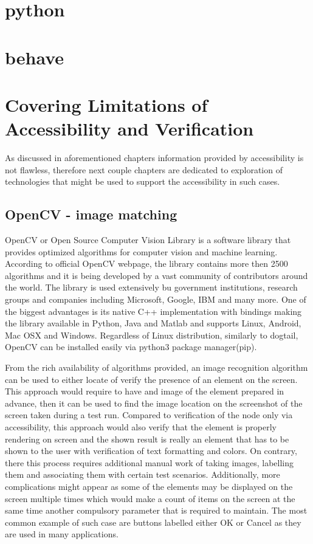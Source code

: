 \chapter{python}
\chapter{behave}
\chapter{Covering Limitations of Accessibility and Verification}
As discussed in aforementioned chapters information provided by accessibility is not flawless, therefore next couple chapters are dedicated to exploration of technologies that might be used to support the accessibility in such cases.

\section{OpenCV - image matching}
OpenCV or Open Source Computer Vision Library is a software library that provides optimized algorithms for computer vision and machine learning. According to official OpenCV webpage\cite{opencv}, the library contains more then 2500 algorithms and it is being developed 
by a vast community of contributors around the world. The library is used extensively bu government institutions, research groups and companies including Microsoft, Google, IBM and many more. One of the biggest advantages is its native C++ implementation with bindings making the library available in Python, Java and Matlab and supports Linux, Android, Mac OSX and Windows. Regardless of Linux distribution, similarly to dogtail, OpenCV can be installed easily via python3 package manager(pip). 

From the rich availability of algorithms provided, an image recognition algorithm can be used to either locate of verify the presence of an element on the screen. This approach would require to have and image of the element prepared in advance, then it can be used to find the image location on the screenshot of the screen taken during a test run. Compared to verification of the node only via accessibility, this approach would also verify that the element is properly rendering on screen and the shown result is really an element that has to be shown to the user with verification of text formatting and colors. On contrary, there this process requires additional manual work of taking images, labelling them and associating them with certain test scenarios. Additionally, more complications might appear as some of the elements may be displayed on the screen multiple times which would make a count of items on the screen at the same time another compulsory parameter that is required to maintain. The most common example of such case are buttons labelled either OK or Cancel as they are used in many applications.

